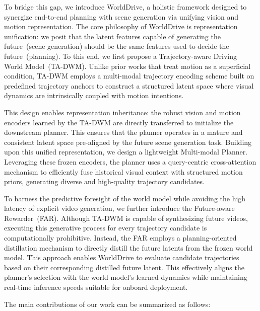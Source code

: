 To bridge this gap, we introduce WorldDrive, a holistic framework designed to synergize end-to-end planning with scene generation via unifying vision and motion representation. The core philosophy of WorldDrive is representation unification: we posit that the latent features capable of generating the future~(scene generation) should be the same features used to decide the future~(planning). To this end, we first propose a Trajectory-aware Driving World Model~(TA-DWM). Unlike prior works that treat motion as a superficial condition, TA-DWM employs a multi-modal trajectory encoding scheme built on predefined trajectory anchors to construct a structured latent space where visual dynamics are intrinsically coupled with motion intentions. 

This design enables representation inheritance: the robust vision and motion encoders learned by the TA-DWM are directly transferred to initialize the downstream planner. This ensures that the planner operates in a mature and consistent latent space pre-aligned by the future scene generation task. Building upon this unified representation, we design a lightweight Multi-modal Planner. Leveraging these frozen encoders, the planner uses a query-centric cross-attention mechanism to efficiently fuse historical visual context with structured motion priors, generating diverse and high-quality trajectory candidates.

To harness the predictive foresight of the world model while avoiding the high latency of explicit video generation, we further introduce the Future-aware Rewarder~(FAR). Although TA-DWM is capable of synthesizing future videos, executing this generative process for every trajectory candidate is computationally prohibitive. Instead, the FAR employs a planning-oriented distillation mechanism to directly distill the future latents from the frozen world model. This approach enables WorldDrive to evaluate candidate trajectories based on their corresponding distilled future latent. This effectively aligns the planner’s selection with the world model’s learned dynamics while maintaining real-time inference speeds suitable for onboard deployment.

The main contributions of our work can be summarized as follows:


